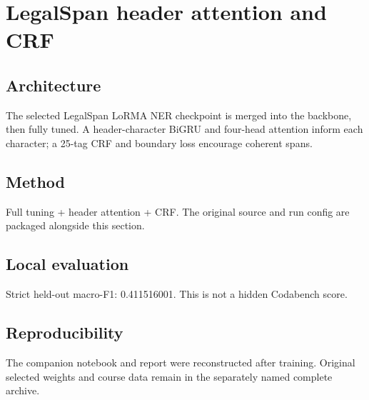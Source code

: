 \section{LegalSpan header attention and CRF}
\subsection{Architecture}
The selected LegalSpan LoRMA NER checkpoint is merged into the backbone, then fully tuned. A header-character BiGRU and four-head attention inform each character; a 25-tag CRF and boundary loss encourage coherent spans.
\subsection{Method}
Full tuning + header attention + CRF. The original source and run config are packaged alongside this section.
\subsection{Local evaluation}
Strict held-out macro-F1: 0.411516001. This is not a hidden Codabench score.
\subsection{Reproducibility}
The companion notebook and report were reconstructed after training. Original selected weights and course data remain in the separately named complete archive.
